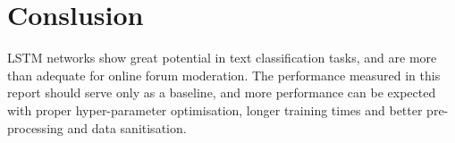 \chapter{Conslusion}
LSTM networks show great potential in text classification tasks, and
are more than adequate for online forum moderation. The performance
measured in this report should serve only as a baseline, and more
performance can be expected with proper hyper-parameter optimisation,
longer training times and better pre-processing and data sanitisation.